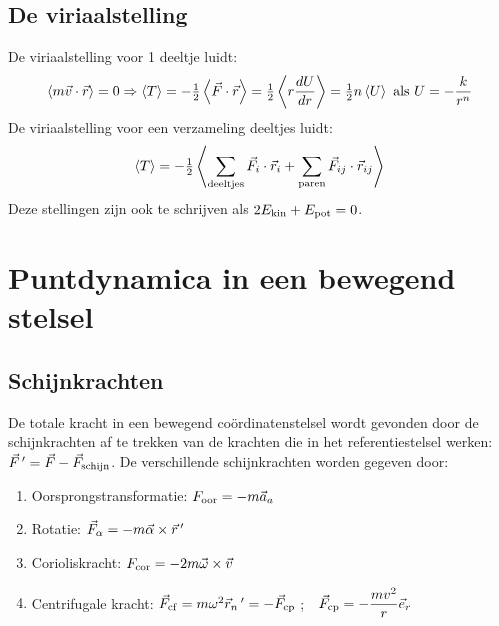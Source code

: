 \subsection{De viriaalstelling}
De viriaalstelling voor 1 deeltje luidt:
\[
\left\langle m\vec{v}\cdot\vec{r} \right\rangle=0\Rightarrow\left\langle T \right\rangle=-\mbox{$\frac{1}{2}$}\left\langle \vec{F}\cdot\vec{r} \right\rangle=\mbox{$\frac{1}{2}$}\left\langle r\frac{dU}{dr} \right\rangle=
\mbox{$\frac{1}{2}$} n\left\langle U \right\rangle\mbox{ als } U=-\frac{k}{r^n}
\]
De viriaalstelling voor een verzameling deeltjes luidt:
\[
\left\langle T \right\rangle=-\mbox{$\frac{1}{2}$}\left\langle \sum\limits_{\rm deeltjes}\vec{F}_i\cdot\vec{r}_i+
\sum\limits_{\rm paren}\vec{F}_{ij}\cdot\vec{r}_{ij} \right\rangle
\]
Deze stellingen zijn ook te schrijven als $2E_{\rm kin}+E_{\rm pot}=0$.

\section{Puntdynamica in een bewegend stelsel}
\subsection{Schijnkrachten}
De totale kracht in een bewegend co\"ordinatenstelsel wordt gevonden door de
schijnkrachten af te trekken van de krachten die in het referentiestelsel
werken: $\vec{F}\,'=\vec{F}-\vec{F}_{\rm schijn}$. De verschillende
schijnkrachten worden gegeven door:
\begin{enumerate}
\item Oorsprongstransformatie: $F_{\rm oor}=-m\vec{a}_a$
\item Rotatie: $\vec{F}_{\alpha}=-m\vec{\alpha}\times\vec{r}\,'$
\item Corioliskracht: $F_{\rm cor}=-2m\vec{\omega}\times\vec{v}$
\item Centrifugale kracht: $\vec{F}_{\rm cf}=m\omega^2\vec{r}_n\,'=-\vec{F}_{\rm cp}$
      ;~~$\displaystyle\vec{F}_{\rm cp}=-\frac{mv^2}{r}\vec{e}_{r}$
\end{enumerate}

